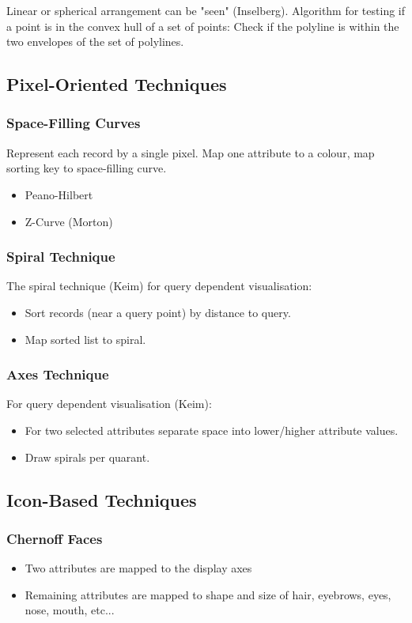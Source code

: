 Linear or spherical arrangement can be "seen" (Inselberg). Algorithm for testing if a point is in the convex hull of a set of points: Check if the polyline is within the two envelopes of the set of polylines.

\subsection{Pixel-Oriented Techniques}
\subsubsection{Space-Filling Curves}
Represent each record by a single pixel. Map one attribute to a colour, map sorting key to space-filling curve.
\begin{itemize}
    \item Peano-Hilbert
    \item Z-Curve (Morton)
\end{itemize}
\subsubsection{Spiral Technique}
The spiral technique (Keim) for query dependent visualisation:
\begin{itemize}
\item Sort records (near a query point) by distance to query.
\item Map sorted list to spiral.
\end{itemize}

\subsubsection{Axes Technique}
For query dependent visualisation (Keim): 
\begin{itemize}
\item For two selected attributes separate space into lower/higher attribute values. 
\item Draw spirals per quarant.
\end{itemize}
\subsection{Icon-Based Techniques}
\subsubsection{Chernoff Faces}
\begin{itemize}
\item Two attributes are mapped to the display axes
\item Remaining attributes are mapped to shape and size of hair, eyebrows, eyes, nose, mouth, etc...
\end{itemize}

